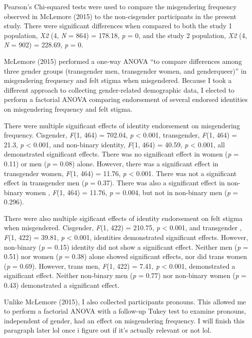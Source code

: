 \documentclass[12pt,twoside]{reedthesis}
\begin{document}
Pearson's Chi-squared tests were used to compare the misgendering frequency observed in McLemore (2015) to the non-cisgender participants in the present study.
There were significant differences when compared to both the study 1 population, \emph{X2} (4, \emph{N} = 864) = 178.18, \emph{p} = 0, and the study 2 population, \emph{X2} (4, \emph{N} = 902) = 228.69, \emph{p} = 0.

McLemore (2015) performed a one-way ANOVA ``to compare differences among three gender groups (transgender men, transgender women, and genderqueer)'' in misgendering frequency and felt stigma when misgendered.
Because I took a different approach to collecting gender-related demographic data, I elected to perform a factorial ANOVA comparing endorsement of several endorsed identities on misgendering frequency and felt stigma.

There were multiple significant effects of identity endorsement on misgendering frequency.
Cisgender, \emph{F}(1, 464) = 702.04, \emph{p} \textless{} 0.001,
transgender, \emph{F}(1, 464) = 21.3, \emph{p} \textless{} 0.001,
and non-binary identity, \emph{F}(1, 464) = 40.59, \emph{p} \textless{} 0.001, all demonstrated significant effects.
There was no significant effect in women (\emph{p} = 0.11) or men (\emph{p} = 0.08) alone.
However, there was a significant effect in transgender women, \emph{F}(1, 464) = 11.76, \emph{p} \textless{} 0.001.
There was not a significant effect in transgender men (\emph{p} = 0.37).
There was also a significant effect in non-binary women , \emph{F}(1, 464) = 11.76, \emph{p} = 0.004,
but not in non-binary men (\emph{p} = 0.296).

There were also multiple sigificant effects of identity endorsement on felt stigma when misgendered.
Cisgender, \emph{F}(1, 422) = 210.75, \emph{p} \textless{} 0.001,
and transgender , \emph{F}(1, 422) = 39.81, \emph{p} \textless{} 0.001, identities demonstrated significant effects.
However, non-binary (\emph{p} = 0.15) identity did not show a significant effect.
Neither men (\emph{p} = 0.51) nor women (\emph{p} = 0.38) alone showed significant effects, nor did trans women (\emph{p} = 0.69).
However, trans men, \emph{F}(1, 422) = 7.41, \emph{p} \textless{} 0.001, demonstrated a significant effect.
Neither non-binary men (\emph{p} = 0.77) nor non-binary women (\emph{p} = 0.43) demonstrated a significant effect.

Unlike McLemore (2015), I also collected participants pronouns. This allowed me to perform a factorial ANOVA with a follow-up Tukey test to examine pronouns, independent of gender, had an effect on misgendering frequency. I will finish this paragraph later lol once i figure out if it's actually relevant or not lol.
\end{document}
